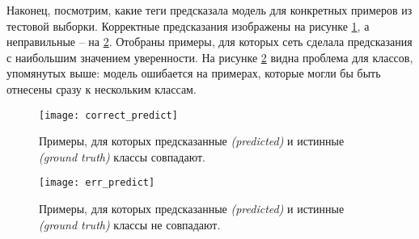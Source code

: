 \indent
\indent
Наконец, посмотрим, какие теги предсказала модель для конкретных
примеров из тестовой выборки. Корректные предсказания изображены
на рисунке \ref{tikzpicture: correct_predict}, а неправильные -- на
\ref{tikzpicture: err_predict}. Отобраны примеры, для которых сеть сделала
предсказания с наибольшим значением уверенности.
На рисунке \ref{tikzpicture: err_predict} видна
проблема для классов, упомянутых выше: модель ошибается на примерах, 
которые могли бы быть отнесены сразу к нескольким классам.


\begin{figure}[h!]
    \begin{center}
   	    \texttt{[image: correct\_predict]}
   	\end{center}
   	\caption{Примеры, для которых предсказанные
   	 \textit{(predicted)} и истинные \textit{(ground truth)} классы совпадают.}
   	\label{tikzpicture: correct_predict}
\end{figure}


\begin{figure}[h!]
    \begin{center}
   	    \texttt{[image: err\_predict]}
   	\end{center}
   	\caption{Примеры, для которых предсказанные
   	 \textit{(predicted)} и истинные \textit{(ground truth)} классы не совпадают.}
   	\label{tikzpicture: err_predict}
\end{figure}
